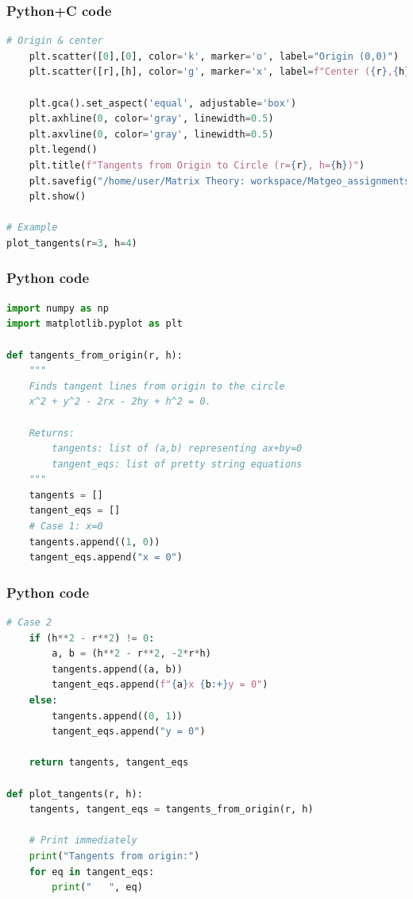 \documentclass{beamer}
\begin{document}
\begin{frame}[fragile]
    \frametitle{Python+C code}

    \begin{lstlisting}[language=Python]
# Origin & center
    plt.scatter([0],[0], color='k', marker='o', label="Origin (0,0)")
    plt.scatter([r],[h], color='g', marker='x', label=f"Center ({r},{h})")

    plt.gca().set_aspect('equal', adjustable='box')
    plt.axhline(0, color='gray', linewidth=0.5)
    plt.axvline(0, color='gray', linewidth=0.5)
    plt.legend()
    plt.title(f"Tangents from Origin to Circle (r={r}, h={h})")
    plt.savefig("/home/user/Matrix Theory: workspace/Matgeo_assignments/10.7.75/figs/figure_1.png")
    plt.show()

# Example
plot_tangents(r=3, h=4)


    \end{lstlisting}
\end{frame}

\begin{frame}[fragile]
    \frametitle{Python code}
    \begin{lstlisting}[language=Python]
import numpy as np
import matplotlib.pyplot as plt

def tangents_from_origin(r, h):
    """
    Finds tangent lines from origin to the circle
    x^2 + y^2 - 2rx - 2hy + h^2 = 0.
    
    Returns:
        tangents: list of (a,b) representing ax+by=0
        tangent_eqs: list of pretty string equations
    """
    tangents = []
    tangent_eqs = []
    # Case 1: x=0
    tangents.append((1, 0))
    tangent_eqs.append("x = 0")

    \end{lstlisting}   
\end{frame}

\begin{frame}[fragile]
    \frametitle{Python code}
    \begin{lstlisting}[language=Python]
# Case 2
    if (h**2 - r**2) != 0:
        a, b = (h**2 - r**2, -2*r*h)
        tangents.append((a, b))
        tangent_eqs.append(f"{a}x {b:+}y = 0")
    else:
        tangents.append((0, 1))
        tangent_eqs.append("y = 0")
        
    return tangents, tangent_eqs

def plot_tangents(r, h):
    tangents, tangent_eqs = tangents_from_origin(r, h)
    
    # Print immediately
    print("Tangents from origin:")
    for eq in tangent_eqs:
        print("   ", eq)
    \end{lstlisting}   
\end{frame}
\end{document}
